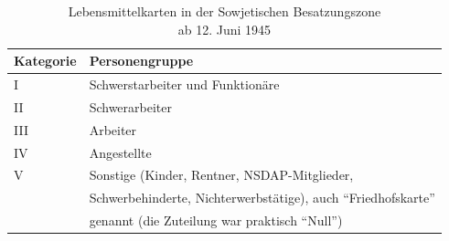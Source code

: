 \documentclass[a5paper,pagesize,10pt,twoside=true]{scrbook}
\begin{document}
\begin{table}[h!]
	\label{tab:lebensmittelkarten}
	\centering	
	\begin{tabular}{l|l}
		Kategorie & Personengruppe \\
		\hline
		I & Schwerstarbeiter und Funktionäre \\
		II & Schwerarbeiter \\
		III & Arbeiter \\
		IV & Angestellte \\
		V & Sonstige (Kinder, Rentner, NSDAP-Mitglieder, \\
		& Schwerbehinderte, Nichterwerbstätige), auch \enquote{Friedhofskarte}\\
		& genannt (die Zuteilung war praktisch \enquote{Null})
	\end{tabular}
	\caption{Lebensmittelkarten in der Sowjetischen Besatzungszone\\ ab 12. Juni 1945}
\end{table}
\end{document}
